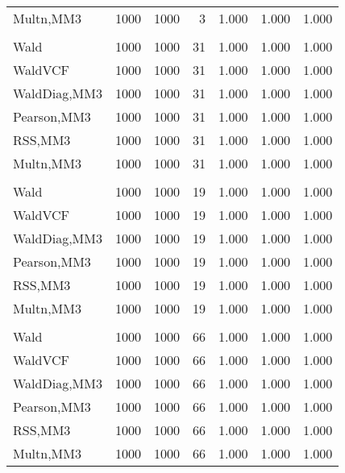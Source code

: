 \documentclass[
]{article}
\begin{document}
\begin{table}[H]
{\begin{tabular}[t]{lrrrrrr}
\hspace{1em}Multn,MM3 & 1000 & 1000 & 3 & 1.000 & 1.000 & 1.000\\
\addlinespace[0.3em]
\multicolumn{7}{l}{\textbf{1F 15V}}\\
\hspace{1em}Wald & 1000 & 1000 & 31 & 1.000 & 1.000 & 1.000\\
\hspace{1em}WaldVCF & 1000 & 1000 & 31 & 1.000 & 1.000 & 1.000\\
\hspace{1em}WaldDiag,MM3 & 1000 & 1000 & 31 & 1.000 & 1.000 & 1.000\\
\hspace{1em}Pearson,MM3 & 1000 & 1000 & 31 & 1.000 & 1.000 & 1.000\\
\hspace{1em}RSS,MM3 & 1000 & 1000 & 31 & 1.000 & 1.000 & 1.000\\
\hspace{1em}Multn,MM3 & 1000 & 1000 & 31 & 1.000 & 1.000 & 1.000\\
\addlinespace[0.3em]
\multicolumn{7}{l}{\textbf{2F 10V}}\\
\hspace{1em}Wald & 1000 & 1000 & 19 & 1.000 & 1.000 & 1.000\\
\hspace{1em}WaldVCF & 1000 & 1000 & 19 & 1.000 & 1.000 & 1.000\\
\hspace{1em}WaldDiag,MM3 & 1000 & 1000 & 19 & 1.000 & 1.000 & 1.000\\
\hspace{1em}Pearson,MM3 & 1000 & 1000 & 19 & 1.000 & 1.000 & 1.000\\
\hspace{1em}RSS,MM3 & 1000 & 1000 & 19 & 1.000 & 1.000 & 1.000\\
\hspace{1em}Multn,MM3 & 1000 & 1000 & 19 & 1.000 & 1.000 & 1.000\\
\addlinespace[0.3em]
\multicolumn{7}{l}{\textbf{3F 15V}}\\
\hspace{1em}Wald & 1000 & 1000 & 66 & 1.000 & 1.000 & 1.000\\
\hspace{1em}WaldVCF & 1000 & 1000 & 66 & 1.000 & 1.000 & 1.000\\
\hspace{1em}WaldDiag,MM3 & 1000 & 1000 & 66 & 1.000 & 1.000 & 1.000\\
\hspace{1em}Pearson,MM3 & 1000 & 1000 & 66 & 1.000 & 1.000 & 1.000\\
\hspace{1em}RSS,MM3 & 1000 & 1000 & 66 & 1.000 & 1.000 & 1.000\\
\hspace{1em}Multn,MM3 & 1000 & 1000 & 66 & 1.000 & 1.000 & 1.000\\
\bottomrule
\end{tabular}}
\endgroup{}
\end{table}
\end{document}
